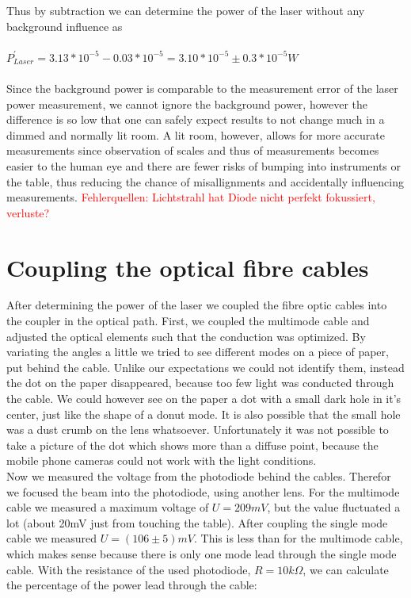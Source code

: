 \documentclass{article}
\begin{document}
Thus by subtraction we can determine the power of the laser without any background influence as

\paragraph{}


$P^{'}_{Laser} = 3.13*10^{-5}- 0.03*10^{-5} =3.10*10^{-5} \pm 0.3*10^{-5}W$

\paragraph{}
Since the background power is comparable to the measurement error of
the laser power measurement, we cannot ignore the background power, however the difference is so low that one can safely expect results to not change much in a dimmed and normally lit room. A lit room, however, allows for more accurate measurements since observation of scales and thus of measurements becomes easier to the human eye and there are fewer risks of bumping into instruments or the table, thus reducing the chance of misallignments and accidentally influencing measurements.
\textcolor{red}{Fehlerquellen: Lichtstrahl hat Diode nicht perfekt fokussiert, verluste?}

\section{Coupling the optical fibre cables}

After determining the power of the laser we coupled the fibre optic cables into the coupler in the optical path. First, we coupled the multimode cable and adjusted the optical elements such that the conduction was optimized. By variating the angles a little we tried to see different modes on a piece of paper, put behind the cable. Unlike our expectations we could not identify them, instead the dot on the paper disappeared, because too few light was conducted through the cable. We could however see on the paper a dot with a small dark hole in it's center, just like the shape of a donut mode. It is also possible that the small hole was a dust crumb on the lens whatsoever. Unfortunately it was not possible to take a picture of the dot which shows more than a diffuse point, because the mobile phone cameras could not work with the light conditions.\\

Now we measured the voltage from the photodiode behind the cables. Therefor we focused the beam into the photodiode, using another lens. For the multimode cable we measured a maximum voltage of $U=209mV$, but the value fluctuated a lot (about 20mV just from touching the table). After coupling the single mode cable we measured $U=(106 \pm 5)mV$. This is less than for the multimode cable, which makes sense because there is only one mode lead through the single mode cable. With the resistance of the used photodiode, $R = 10k\Omega$, we can calculate the percentage of the power lead through the cable:\\
\end{document}
